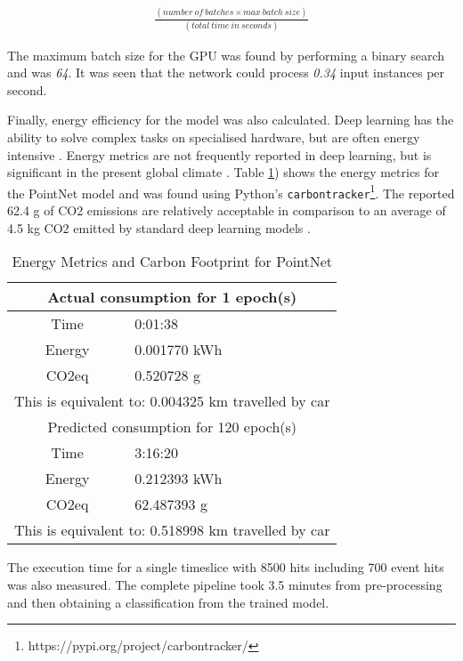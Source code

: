 \begin{align*}
    \frac{(number \ of\ batches \times max\ batch\ size)}{(total\ time\ in\ seconds)}
\end{align*}

The maximum batch size for the GPU was found by performing a binary search and was \textit{64}. It was seen that the network could process \textit{0.34} input instances per second.

Finally, energy efficiency for the model was also calculated. Deep learning has the ability to solve complex tasks on specialised hardware, but are often energy intensive \cite{anthony2020carbontracker}. Energy metrics are not frequently reported in deep learning, but is significant in the present global climate \cite{anthony2020carbontracker}. Table \ref{tab:carbon}) shows the energy metrics for the PointNet model and was found using Python's \texttt{carbontracker}\footnote{https://pypi.org/project/carbontracker/}. The reported 62.4 g of CO2 emissions are relatively acceptable in comparison to an average of 4.5 kg CO2 emitted by standard deep learning models \cite{strubell2019energy}. 

\begin{table}[ht!]
    \centering
    \begin{tabular}{c l}
    \hline
    \multicolumn{2}{c}{Actual consumption for 1 epoch(s)} \\
    \hline
    Time & 0:01:38 \\
    Energy & 0.001770 kWh \\
    CO2eq & 0.520728 g \\
    \multicolumn{2}{c}{This is equivalent to:
	0.004325 km travelled by car} \\
	\hline
	\multicolumn{2}{c}{Predicted consumption for 120 epoch(s)}\\
	\hline
	Time & 3:16:20 \\
    Energy & 0.212393 kWh \\
    CO2eq & 62.487393 g \\
    \multicolumn{2}{c}{This is equivalent to:
	0.518998 km travelled by car} \\
	\hline
    \end{tabular}
    \caption{Energy Metrics and Carbon Footprint for PointNet}
    \label{tab:carbon}
\end{table}

The execution time for a single timeslice with 8500 hits including 700 event hits was also measured. The complete pipeline took 3.5 minutes from pre-processing and then obtaining a classification from the trained model. 


